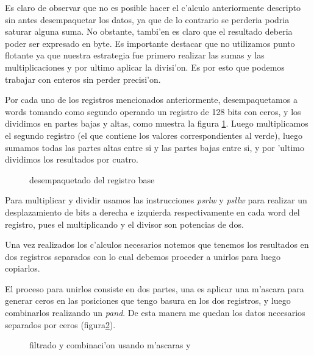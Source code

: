 Es claro de observar que no es posible hacer el c'alculo anteriormente descripto sin antes desempaquetar los datos, ya que de lo contrario se perderia podria saturar alguna suma. No obstante, tambi'en es claro que el resultado deberia poder ser expresado en byte. Es importante destacar que no utilizamos punto flotante ya que nuestra estrategia fue primero realizar las sumas y las multiplicaciones y por ultimo aplicar la divisi'on. Es por esto que podemos trabajar con enteros sin perder precisi'on.

Por cada uno de los registros mencionados anteriormente, desempaquetamos a words tomando como segundo operando un registro de 128
bits con ceros, y los dividimos en partes bajas y altas, como muestra la figura \ref{est:m-tres}. Luego multiplicamos el segundo registro (el que contiene los valores correspondientes al verde), luego sumamos todas las partes altas entre si y las partes bajas entre si, y por 'ultimo dividimos los resultados por cuatro. 

\begin{figure}[h!]
\caption{desempaquetado del registro base}
\label{est:m-tres}
\end{figure}

Para multiplicar y dividir usamos las instrucciones \textit{psrlw} y \textit{psllw} para realizar un desplazamiento de bits a derecha e izquierda respectivamente en cada word del registro, pues el multiplicando y el divisor son potencias de dos. 

Una vez realizados los c'alculos necesarios notemos que tenemos los resultados en dos registros separados con lo cual debemos proceder a unirlos para luego copiarlos. 

El proceso para unirlos consiste en dos partes, una es aplicar una m'ascara para generar ceros en las posiciones que tengo basura en los dos registros, y luego  combinarlos realizando un \textit{pand}. De esta manera me quedan los datos necesarios separados por ceros (figura\ref{est:m-cuatro}).

\begin{figure}[h!]
\caption{filtrado y combinaci'on usando m'ascaras  y }
\label{est:m-cuatro}
\end{figure}

